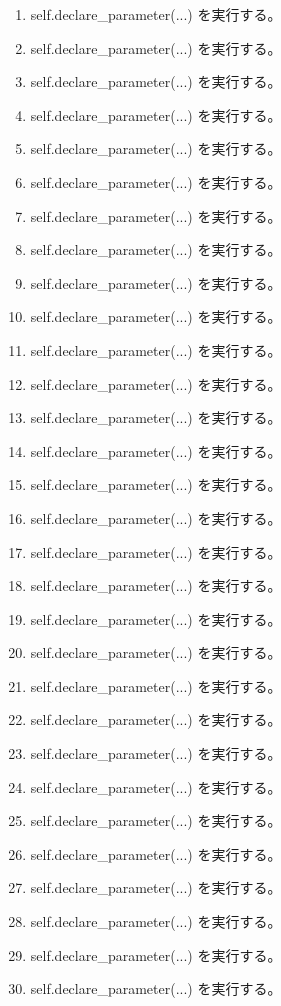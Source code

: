 \documentclass[a4paper,11pt]{article}
\begin{document}
\begin{enumerate}[leftmargin=1.8em]
\item self.declare\_parameter(...) を実行する。
\item self.declare\_parameter(...) を実行する。
\item self.declare\_parameter(...) を実行する。
\item self.declare\_parameter(...) を実行する。
\item self.declare\_parameter(...) を実行する。
\item self.declare\_parameter(...) を実行する。
\item self.declare\_parameter(...) を実行する。
\item self.declare\_parameter(...) を実行する。
\item self.declare\_parameter(...) を実行する。
\item self.declare\_parameter(...) を実行する。
\item self.declare\_parameter(...) を実行する。
\item self.declare\_parameter(...) を実行する。
\item self.declare\_parameter(...) を実行する。
\item self.declare\_parameter(...) を実行する。
\item self.declare\_parameter(...) を実行する。
\item self.declare\_parameter(...) を実行する。
\item self.declare\_parameter(...) を実行する。
\item self.declare\_parameter(...) を実行する。
\item self.declare\_parameter(...) を実行する。
\item self.declare\_parameter(...) を実行する。
\item self.declare\_parameter(...) を実行する。
\item self.declare\_parameter(...) を実行する。
\item self.declare\_parameter(...) を実行する。
\item self.declare\_parameter(...) を実行する。
\item self.declare\_parameter(...) を実行する。
\item self.declare\_parameter(...) を実行する。
\item self.declare\_parameter(...) を実行する。
\item self.declare\_parameter(...) を実行する。
\item self.declare\_parameter(...) を実行する。
\item self.declare\_parameter(...) を実行する。
            \end{enumerate}
\end{document}
